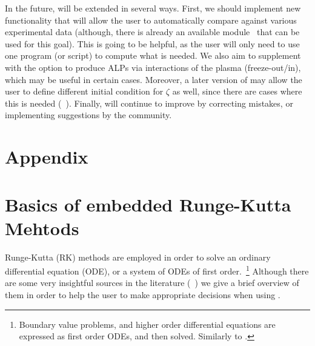\documentclass[11pt,a4paper]{article}
\renewcommand{\theequation}{\arabic{section}.\arabic{equation}}
\begin{document}
In the future, \mimes will be extended in several ways. First, we should implement new functionality that will allow the user to automatically compare against various experimental data (although, there is already an available module~\cite{2020-AxionLimits} that can be used for this goal). This is going to be helpful, as the user will only need to use one program (or script) to compute what is needed. We also aim to supplement \mimes with the option to produce ALPs via interactions of the plasma (\eg freeze-out/in), which may be useful in certain cases.  Moreover, a later version of \mimes may allow the user to define different initial condition for $\zeta$ as well, since there are cases where this is needed (\eg~\cite{Co:2019jts}). Finally, \mimes will continue to improve by correcting mistakes, or implementing suggestions by the community.

\setcounter{section}{0}
\section*{Appendix}
\appendix

\renewcommand{\theequation}{\Alph{section}.\arabic{equation}}
\setcounter{equation}{0}  %

\section{Basics of embedded Runge-Kutta Mehtods}\label{app:RK}
\setcounter{equation}{0}
%
Runge-Kutta (RK) methods are employed in order to solve an ordinary differential equation (ODE), or a system of ODEs of first order.~\footnote{Boundary value problems, and higher order differential equations are expressed as first order ODEs, and then solved. Similarly to  .}   Although there are some very insightful sources in the literature (\eg~\cite{Hairer,hairer2010solving,10.5555/1403886}) we give a brief overview of them in order to help the user to make appropriate decisions when using \mimes.
\end{document}
